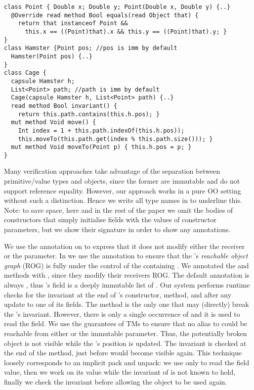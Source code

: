 \begin{lstlisting}
class Point { Double x; Double y; Point(Double x, Double y) {..}
  @Override read method Bool equals(read Object that) {
    return that instanceof Point &&
      this.x == ((Point)that).x && this.y == ((Point)that).y; }
}
class Hamster {Point pos; //pos is imm by default
  Hamster(Point pos) {..} 
}
class Cage {
  capsule Hamster h;
  List<Point> path; //path is imm by default
  Cage(capsule Hamster h, List<Point> path) {..}
  read method Bool invariant() {
    return this.path.contains(this.h.pos); }
  mut method Void move() {
    Int index = 1 + this.path.indexOf(this.h.pos));
    this.moveTo(this.path.get(index % this.path.size())); }
  mut method Void moveTo(Point p) { this.h.pos = p; }
}
\end{lstlisting}
Many verification approaches take advantage of the separation between primitive/value types and objects, since the former are immutable and do not support reference equality.
However, our approach works in a pure OO setting without such a distinction. Hence we write all type names in \Q@BoldTitleCase@ to underline this. Note: to save space, here and in the rest of the paper we omit the bodies of constructors that simply initialise fields with the values of constructor parameters, but we show their signature in order to show any annotations.

We use the \Q@read@ annotation on \Q@equals@ to express that it does not modify either the
receiver or the parameter. In \Q@Cage@ we use 
the \Q@capsule@ annotation to ensure
that the \Q@Hamster@'s \emph{reachable object graph} (ROG) is fully under the control
of the containing \Q@Cage@. 
We annotated the \Q@move@
and \Q@moveTo@ methods with \Q@mut@, since they modify
their receivers ROG. The default annotation is always \Q@imm@, thus \Q@Cage@'s \Q@path@ field is a deeply immutable list of \Q@Point@s.
Our system performs runtime checks for the invariant
at the end of \Q@Cage@'s constructor, \Q@moveTo@ method, and after any update to one of its fields.
The \Q@moveTo@ method is the only one that may (directly) break the \Q@Cage@'s invariant. However, there is only a single occurrence of \Q@this@ and it is used to read the \Q@h@ field. We use the guarantees of TMs to ensure that no alias to \Q@this@ could be reachable from either \Q@h@ or the immutable \Q@Point@ parameter. Thus, the potentially broken \Q@this@ object is not visible while the \Q@Hamster@'s position is updated. 
The invariant is checked at the end of the \Q@moveTo@ method, just before \Q@this@ would become visible again.
This technique loosely corresponds to an implicit pack and unpack: we use \Q@this@ only to read the field value, then we work on its value while the invariant of \Q@this@ is not known to hold, finally we check the invariant before allowing the object to  be used again.

